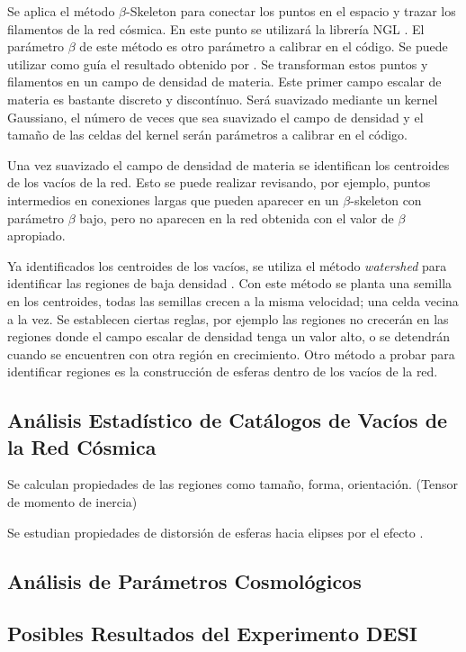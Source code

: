 \documentclass[preprint]{aastex62}
\begin{document}
  Se aplica el método $\beta$-Skeleton para conectar los puntos en el espacio y trazar los
  filamentos de la red cósmica. En este punto se utilizará la librería NGL \citep{ngl}.
  El parámetro $\beta$ de este método es otro parámetro a calibrar en el código. Se puede
  utilizar como guía el resultado obtenido por \citet{Fang2018}.
  Se transforman estos puntos y filamentos en un campo de densidad de materia. Este primer
  campo escalar de materia es bastante discreto y discontínuo. Será suavizado mediante un
  kernel Gaussiano, el número de veces que sea suavizado el campo de densidad y el tamaño de
  las celdas del kernel serán parámetros a calibrar en el código.

  Una vez suavizado el campo de densidad de materia se identifican los centroides
  de los vacíos de la red. Esto se puede realizar revisando, por ejemplo, puntos intermedios
  en conexiones largas que pueden aparecer en un $\beta$-skeleton con parámetro $\beta$ bajo,
  pero no aparecen en la red obtenida con el valor de $\beta$ apropiado.

  Ya identificados los centroides de los vacíos, se utiliza el método \textit{watershed}
  para identificar las regiones de baja densidad \citep{Sutter2015}. Con este método
  se planta una semilla en los centroides, todas las semillas crecen a la misma velocidad; una
  celda vecina a la vez. Se establecen ciertas reglas, por ejemplo las regiones no crecerán en
  las regiones donde el campo escalar de densidad tenga un valor alto, o se detendrán cuando
  se encuentren con otra región en crecimiento. Otro método a probar para identificar regiones
  es la construcción de esferas dentro de los vacíos de la red. 

  \subsection{Análisis Estadístico de Catálogos de Vacíos de la Red Cósmica}

  Se calculan propiedades de las regiones como tamaño, forma, orientación. (Tensor de momento de inercia) \citep{El-Ad1997}

  Se estudian propiedades de distorsión de esferas hacia elipses por el efecto \citet{AlcockPaczynski1979}.
  \subsection{Análisis de Parámetros Cosmológicos}

  \subsection{Posibles Resultados del Experimento DESI}
    
\end{document}
